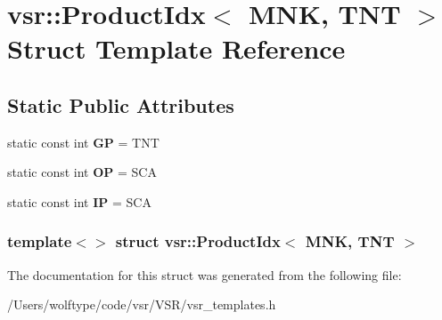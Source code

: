 \hypertarget{structvsr_1_1_product_idx_3_01_m_n_k_00_01_t_n_t_01_4}{\section{vsr\-:\-:Product\-Idx$<$ M\-N\-K, T\-N\-T $>$ Struct Template Reference}
\label{structvsr_1_1_product_idx_3_01_m_n_k_00_01_t_n_t_01_4}
}
\subsection*{Static Public Attributes}
\begin{DoxyCompactItemize}
\item 
\hypertarget{structvsr_1_1_product_idx_3_01_m_n_k_00_01_t_n_t_01_4_aeddda268615f282ac0e0cd24360cd194}{static const int {\bfseries G\-P} = T\-N\-T}\label{structvsr_1_1_product_idx_3_01_m_n_k_00_01_t_n_t_01_4_aeddda268615f282ac0e0cd24360cd194}

\item 
\hypertarget{structvsr_1_1_product_idx_3_01_m_n_k_00_01_t_n_t_01_4_a8c2bc9b3bb1fede39e56959adc30721d}{static const int {\bfseries O\-P} = S\-C\-A}\label{structvsr_1_1_product_idx_3_01_m_n_k_00_01_t_n_t_01_4_a8c2bc9b3bb1fede39e56959adc30721d}

\item 
\hypertarget{structvsr_1_1_product_idx_3_01_m_n_k_00_01_t_n_t_01_4_a111e92de241eadcab7376639edfeb8ac}{static const int {\bfseries I\-P} = S\-C\-A}\label{structvsr_1_1_product_idx_3_01_m_n_k_00_01_t_n_t_01_4_a111e92de241eadcab7376639edfeb8ac}

\end{DoxyCompactItemize}
\subsubsection*{template$<$$>$ struct vsr\-::\-Product\-Idx$<$ M\-N\-K, T\-N\-T $>$}



The documentation for this struct was generated from the following file\-:\begin{DoxyCompactItemize}
\item 
/\-Users/wolftype/code/vsr/\-V\-S\-R/vsr\-\_\-templates.\-h\end{DoxyCompactItemize}

